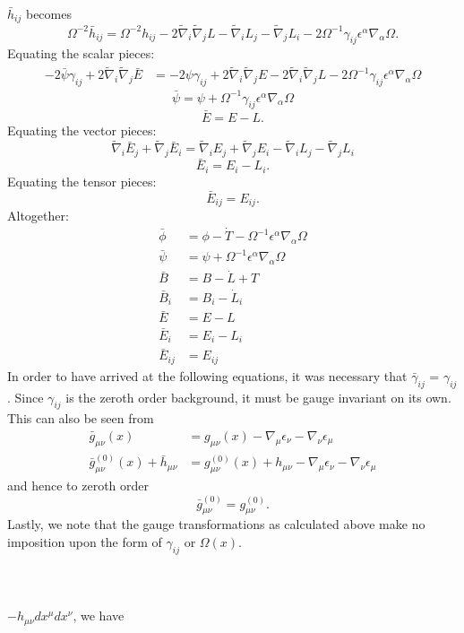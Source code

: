 \documentclass[10pt,letterpaper]{article}
\begin{document}
 $\bar h_{ij}$ becomes
\begin{equation}
\Omega^{-2}\bar h_{ij} = \Omega^{-2} h_{ij} - 2\tilde\nabla_i\tilde\nabla_j L - \tilde\nabla_i L_j -\tilde\nabla_j L_i -2\Omega^{-1}\gamma_{ij}\epsilon^\alpha \nabla_\alpha\Omega .
\end{equation}
Equating the scalar pieces:
\begin{align}
	-2\bar \psi \gamma_{ij} + 
	2\tilde\nabla_i\tilde\nabla_j \bar E   &= -2\psi \gamma_{ij} + 
	2\tilde\nabla_i\tilde\nabla_j E - 2\tilde\nabla_i\tilde\nabla_j L-2\Omega^{-1}\gamma_{ij}\epsilon^\alpha \nabla_\alpha\Omega 
\end{align}
\begin{equation}
	\bar\psi = \psi + \Omega^{-1}\gamma_{ij}\epsilon^\alpha \nabla_\alpha\Omega
\end{equation}
\begin{equation}
	\bar E = E - L.
\end{equation}
Equating the vector pieces:
\begin{equation}
	\tilde\nabla _i \bar E_j + \tilde\nabla_j \bar E_i =\tilde\nabla _i E_j + \tilde\nabla_j E_i   - \tilde\nabla_i L_j -\tilde\nabla_j L_i 
\end{equation}
\begin{equation}
	\bar E_i = E_i - L_i.
\end{equation}
Equating the tensor pieces:
\begin{equation}
\bar E_{ij} = E_{ij}.
\end{equation}
Altogether:
\begin{align}
	\bar\phi &= \phi - \dot T - \Omega^{-1}\epsilon^\alpha \nabla_\alpha \Omega\\
	 \bar\psi &= \psi + \Omega^{-1}\epsilon^\alpha \nabla_\alpha\Omega\\
	\bar B &= B - \dot L + T\\
	\bar B_i &= B_i - \dot L_i\\
	\bar E &= E - L\\
	 \bar E_i &= E_i - L_i  \\
	 \bar E_{ij} &= E_{ij}
\end{align}
In order to have arrived at the following equations, it was necessary that $\bar \gamma_{ij}$ = $\gamma_{ij}$. Since $\gamma_{ij}$ is the zeroth order background, it must be gauge invariant on its own. This can also be seen from
\begin{align}
	\bar g_{\mu\nu}(x) &= g_{\mu\nu}(x) - \nabla_\mu \epsilon_\nu - \nabla_\nu\epsilon_\mu\\
	\bar g_{\mu\nu}^{(0)}(x) + \bar h_{\mu\nu} &= g^{(0)}_{\mu\nu}(x)+h_{\mu\nu}  - \nabla_\mu \epsilon_\nu - \nabla_\nu\epsilon_\mu
\end{align}
and hence to zeroth order
\begin{equation}
	\bar g^{(0)}_{\mu\nu} = g^{(0)}_{\mu\nu}.
\end{equation}
Lastly, we note that the gauge transformations as calculated above make no imposition upon the form of $\gamma_{ij}$ or $\Omega(x)$. 
\\ \\ \\ \\
$-h_{\mu\nu}dx^{\mu}dx^{\nu}$, we have
\end{document}
